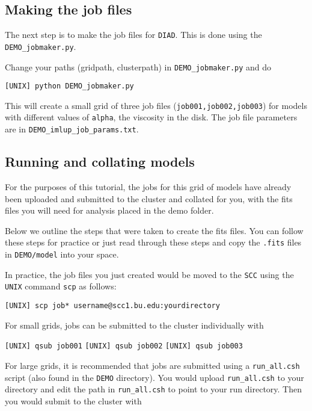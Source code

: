 \documentclass{article}
\begin{document}
\subsection{Making the job files}

The next step is to make the job files for \texttt{DIAD}. This is done using the \texttt{DEMO\_jobmaker.py}. 

Change your paths (gridpath, clusterpath) in \texttt{DEMO\_jobmaker.py} and do

\vspace{2mm}
\texttt{[UNIX] python DEMO\_jobmaker.py}
\vspace{2mm}

This will create a small grid of three job files (\texttt{job001,job002,job003}) for models with different values of \texttt{alpha}, the viscosity in the disk.  The job file parameters are in \texttt{DEMO\_imlup\_job\_params.txt}.

\subsection{Running and collating models}

For the purposes of this tutorial, the jobs for this grid of models have already been uploaded and submitted to the cluster and collated for you, with the fits files you will need for analysis placed in the demo folder. 

Below we outline the steps that were taken to create the fits files.  You can follow these steps for practice or just read through these steps and copy the \texttt{.fits} files in \texttt{DEMO/model} into your space. 

In practice, the job files you just created would be moved to the \texttt{SCC} using the \texttt{UNIX} command \texttt{scp} as follows: 

\vspace{2mm}
\texttt{[UNIX] scp job* username@scc1.bu.edu:yourdirectory}
\vspace{2mm}

For small grids, jobs can be submitted to the cluster individually with

\vspace{2mm}
\texttt{[UNIX] qsub job001}
\texttt{[UNIX] qsub job002}
\texttt{[UNIX] qsub job003}
\vspace{2mm}

For large grids, it is recommended that jobs are submitted using a \texttt{run\_all.csh} script (also found in the \texttt{DEMO} directory).  You would upload \texttt{run\_all.csh} to your directory and edit the path in \texttt{run\_all.csh} to point to your run directory.  Then you would submit to the cluster with
\end{document}
